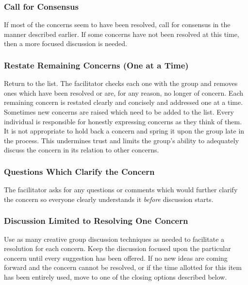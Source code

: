 \subsubsection*{Call for Consensus} %
\label{ssub:call_for_consensus}
If most of the concerns seem to have been resolved, call for consensus in the manner described earlier. If some concerns have not been resolved at this time, then a more focused discussion is needed.

\subsubsection[Restate Remaining Concerns]{Restate Remaining Concerns (One at a Time)}

Return to the list. The facilitator checks each one with the group and removes ones which have been resolved or are, for any reason, no longer of concern. Each remaining concern is restated clearly and concisely and addressed one at a time. Sometimes new concerns are raised which need to be added to the list. Every individual is responsible for honestly expressing concerns as they think of them. It is not appropriate to hold back a concern and spring it upon the group late in the process. This undermines trust and limits the group's ability to adequately discuss the concern in its relation to other concerns.

\subsubsection*{Questions Which Clarify the Concern}

The facilitator asks for any questions or comments which would further clarify the concern so everyone clearly understands it \emph{before} discussion starts.

\subsubsection*{Discussion Limited to Resolving One Concern}

Use as many creative group discussion techniques as needed to
facilitate a resolution for each concern. Keep the discussion
focused upon the particular concern until every suggestion has been
offered. If no new ideas are coming forward and the concern cannot
be resolved, or if the time allotted for this item has been
entirely used, move to one of the closing options described below.

